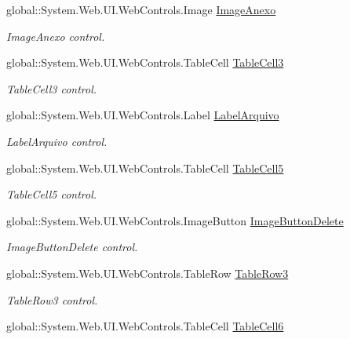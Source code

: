 \begin{DoxyCompactItemize}
global::System.Web.UI.WebControls.Image \hyperlink{class_sistema_r_h_1_1tab__default_a2d617f7626169ff53ee136b71a78b744}{ImageAnexo}
\begin{DoxyCompactList}\small\item\em ImageAnexo control. \item\end{DoxyCompactList}\item 
global::System.Web.UI.WebControls.TableCell \hyperlink{class_sistema_r_h_1_1tab__default_ad0bab6914417f679125b7429feb8f4aa}{TableCell3}
\begin{DoxyCompactList}\small\item\em TableCell3 control. \item\end{DoxyCompactList}\item 
global::System.Web.UI.WebControls.Label \hyperlink{class_sistema_r_h_1_1tab__default_a13f80589969241dafbbeb6700eb7b4c3}{LabelArquivo}
\begin{DoxyCompactList}\small\item\em LabelArquivo control. \item\end{DoxyCompactList}\item 
global::System.Web.UI.WebControls.TableCell \hyperlink{class_sistema_r_h_1_1tab__default_a8d253bd47bccc6da774fe0d5b08a094c}{TableCell5}
\begin{DoxyCompactList}\small\item\em TableCell5 control. \item\end{DoxyCompactList}\item 
global::System.Web.UI.WebControls.ImageButton \hyperlink{class_sistema_r_h_1_1tab__default_a8041c6b74b0c50b86441a8818a7cd7f5}{ImageButtonDelete}
\begin{DoxyCompactList}\small\item\em ImageButtonDelete control. \item\end{DoxyCompactList}\item 
global::System.Web.UI.WebControls.TableRow \hyperlink{class_sistema_r_h_1_1tab__default_aa06e2671b7d9e402a13308f8b34dece2}{TableRow3}
\begin{DoxyCompactList}\small\item\em TableRow3 control. \item\end{DoxyCompactList}\item 
global::System.Web.UI.WebControls.TableCell \hyperlink{class_sistema_r_h_1_1tab__default_aad8487f0eaefdcb616cdc3d2cc21245e}{TableCell6}

\end{DoxyCompactItemize}
